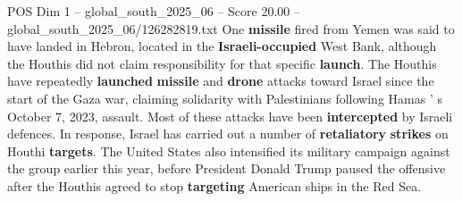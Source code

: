 \begin{textsample}{POS Dim 1 – global\_south\_2025\_06 – Score 20.00 – global\_south\_2025\_06/126282819.txt}
One \textbf{missile} fired from Yemen was said to have landed in Hebron, located in the \textbf{Israeli-occupied} West Bank, although the Houthis did not claim responsibility for that specific \textbf{launch}.
The Houthis have repeatedly \textbf{launched} \textbf{missile} and \textbf{drone} attacks toward Israel since the start of the Gaza war, claiming solidarity with Palestinians following Hamas ' s October 7, 2023, assault.
Most of these attacks have been \textbf{intercepted} by Israeli defences.
In response, Israel has carried out a number of \textbf{retaliatory} \textbf{strikes} on Houthi \textbf{targets}.
The United States also intensified its military campaign against the group earlier this year, before President Donald Trump paused the offensive after the Houthis agreed to stop \textbf{targeting} American ships in the Red Sea.

\end{textsample}

